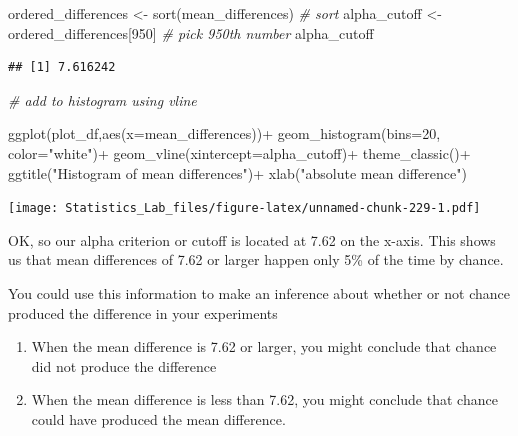 \documentclass[
]{book}
\newenvironment{Shaded}{\begin{snugshade}}{\end{snugshade}}
\newcommand{\AttributeTok}[1]{\textcolor[rgb]{0.77,0.63,0.00}{#1}}
\newcommand{\CommentTok}[1]{\textcolor[rgb]{0.56,0.35,0.01}{\textit{#1}}}
\newcommand{\DecValTok}[1]{\textcolor[rgb]{0.00,0.00,0.81}{#1}}
\newcommand{\FunctionTok}[1]{\textcolor[rgb]{0.00,0.00,0.00}{#1}}
\newcommand{\NormalTok}[1]{#1}
\newcommand{\OtherTok}[1]{\textcolor[rgb]{0.56,0.35,0.01}{#1}}
\newcommand{\SpecialCharTok}[1]{\textcolor[rgb]{0.00,0.00,0.00}{#1}}
\newcommand{\StringTok}[1]{\textcolor[rgb]{0.31,0.60,0.02}{#1}}
\begin{document}
\begin{Shaded}
\begin{Highlighting}[]
\NormalTok{ordered\_differences }\OtherTok{\textless{}{-}} \FunctionTok{sort}\NormalTok{(mean\_differences) }\CommentTok{\# sort}
\NormalTok{alpha\_cutoff }\OtherTok{\textless{}{-}}\NormalTok{ ordered\_differences[}\DecValTok{950}\NormalTok{] }\CommentTok{\# pick 950th number}
\NormalTok{alpha\_cutoff}
\end{Highlighting}
\end{Shaded}

\begin{verbatim}
## [1] 7.616242
\end{verbatim}

\begin{Shaded}
\begin{Highlighting}[]
\CommentTok{\# add to histogram using vline}

\FunctionTok{ggplot}\NormalTok{(plot\_df,}\FunctionTok{aes}\NormalTok{(}\AttributeTok{x=}\NormalTok{mean\_differences))}\SpecialCharTok{+}
  \FunctionTok{geom\_histogram}\NormalTok{(}\AttributeTok{bins=}\DecValTok{20}\NormalTok{, }\AttributeTok{color=}\StringTok{"white"}\NormalTok{)}\SpecialCharTok{+}
  \FunctionTok{geom\_vline}\NormalTok{(}\AttributeTok{xintercept=}\NormalTok{alpha\_cutoff)}\SpecialCharTok{+}
  \FunctionTok{theme\_classic}\NormalTok{()}\SpecialCharTok{+}
  \FunctionTok{ggtitle}\NormalTok{(}\StringTok{"Histogram of mean differences"}\NormalTok{)}\SpecialCharTok{+}
  \FunctionTok{xlab}\NormalTok{(}\StringTok{"absolute mean difference"}\NormalTok{)}
\end{Highlighting}
\end{Shaded}

\texttt{[image: Statistics\_Lab\_files/figure-latex/unnamed-chunk-229-1.pdf]}

OK, so our alpha criterion or cutoff is located at 7.62 on the x-axis. This shows us that mean differences of 7.62 or larger happen only 5\% of the time by chance.

You could use this information to make an inference about whether or not chance produced the difference in your experiments

\begin{enumerate}
\def\labelenumi{\arabic{enumi}.}
\item
  When the mean difference is 7.62 or larger, you might conclude that chance did not produce the difference
\item
  When the mean difference is less than 7.62, you might conclude that chance could have produced the mean difference.
\end{enumerate}
\end{document}
